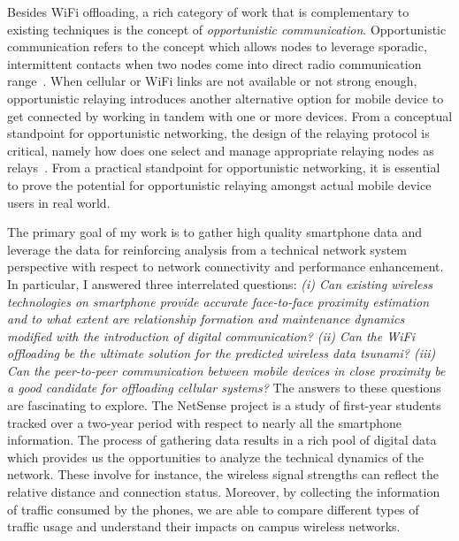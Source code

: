 Besides WiFi offloading, a rich category of work that is complementary to existing techniques is the concept of \emph{opportunistic communication}. Opportunistic communication refers to the concept which allows nodes to leverage sporadic, intermittent contacts when two nodes come into direct radio communication range~\cite{pelusi2006opportunistic}. When cellular or WiFi links are not available or not strong enough, opportunistic relaying introduces another alternative option for mobile device to get connected by working in tandem with one or more devices.  From a conceptual standpoint for opportunistic networking, the design of the relaying protocol is critical, namely how does one select and manage appropriate relaying nodes as relays~\cite{laneman2004cooperative,sendonaris2003user,bletsas2006simple,lu2009design,bahl2009opportunistic}.  From a practical standpoint for opportunistic networking, it is essential to prove the potential for opportunistic relaying amongst actual mobile device users in real world. 

The primary goal of my work is to gather high quality smartphone data and leverage the data for reinforcing analysis from a technical network system perspective with respect to network connectivity and performance enhancement. In particular, I answered three interrelated questions: \emph{(i) Can existing wireless technologies on smartphone provide accurate face-to-face proximity estimation and to what extent are relationship formation and maintenance dynamics modified with the introduction of digital communication? (ii) Can the WiFi offloading be the ultimate solution for the predicted wireless data tsunami? (iii) Can the peer-to-peer communication between mobile devices in close proximity be a good candidate for offloading cellular systems?} The answers to these questions are fascinating to explore. The NetSense project is a study of first-year students tracked over a two-year period with respect to nearly all the smartphone information. The process of gathering data results in a rich pool of digital data which provides us the opportunities to analyze the technical dynamics of the network. These involve for instance, the wireless signal strengths can reflect the relative distance and connection status. Moreover, by collecting the information of traffic consumed by the phones, we are able to compare different types of traffic usage and understand their impacts on campus wireless networks. 

